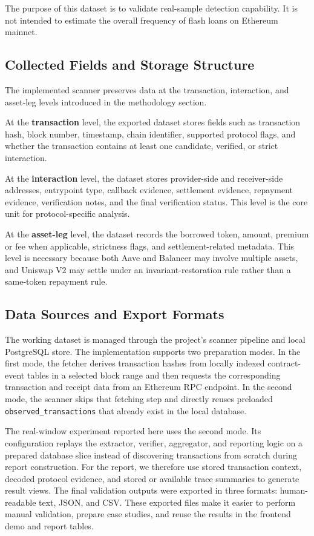 The purpose of this dataset is to validate real-sample detection capability. It is not intended to estimate the overall frequency of flash loans on Ethereum mainnet.

\subsection{Collected Fields and Storage Structure}

The implemented scanner preserves data at the transaction, interaction, and asset-leg levels introduced in the methodology section.

At the \textbf{transaction} level, the exported dataset stores fields such as transaction hash, block number, timestamp, chain identifier, supported protocol flags, and whether the transaction contains at least one candidate, verified, or strict interaction.

At the \textbf{interaction} level, the dataset stores provider-side and receiver-side addresses, entrypoint type, callback evidence, settlement evidence, repayment evidence, verification notes, and the final verification status. This level is the core unit for protocol-specific analysis.

At the \textbf{asset-leg} level, the dataset records the borrowed token, amount, premium or fee when applicable, strictness flags, and settlement-related metadata. This level is necessary because both Aave and Balancer may involve multiple assets, and Uniswap V2 may settle under an invariant-restoration rule rather than a same-token repayment rule.

\subsection{Data Sources and Export Formats}

The working dataset is managed through the project's scanner pipeline and local PostgreSQL store. The implementation supports two preparation modes. In the first mode, the fetcher derives transaction hashes from locally indexed contract-event tables in a selected block range and then requests the corresponding transaction and receipt data from an Ethereum RPC endpoint. In the second mode, the scanner skips that fetching step and directly reuses preloaded \texttt{observed\_transactions} that already exist in the local database.

The real-window experiment reported here uses the second mode. Its configuration replays the extractor, verifier, aggregator, and reporting logic on a prepared database slice instead of discovering transactions from scratch during report construction. For the report, we therefore use stored transaction context, decoded protocol evidence, and stored or available trace summaries to generate result views. The final validation outputs were exported in three formats: human-readable text, JSON, and CSV. These exported files make it easier to perform manual validation, prepare case studies, and reuse the results in the frontend demo and report tables.

